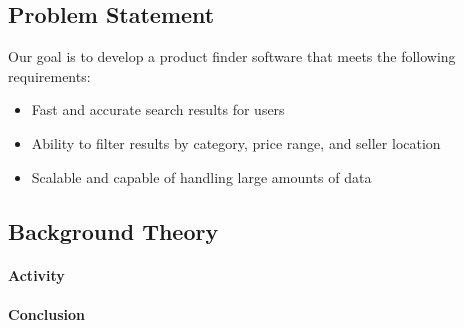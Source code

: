 \documentclass[12pt]{article}
\begin{document}
\subsection{Problem Statement}
Our goal is to develop a product finder software that meets the following requirements:
\begin{itemize}
    \item Fast and accurate search results for users
    \item Ability to filter results by category, price range, and seller location
    \item Scalable and capable of handling large amounts of data
\end{itemize}

\subsection{Background Theory}
\paragraph{Activity}
\paragraph{Conclusion}
\end{document}
